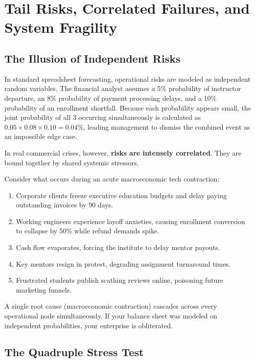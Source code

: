 \section{Tail Risks, Correlated Failures, and System Fragility}

\subsection{The Illusion of Independent Risks}

In standard spreadsheet forecasting, operational risks are modeled as independent random variables. The financial analyst assumes a 5\% probability of instructor departure, an 8\% probability of payment processing delays, and a 10\% probability of an enrollment shortfall. Because each probability appears small, the joint probability of all 3 occurring simultaneously is calculated as $0.05 \times 0.08 \times 0.10 = 0.04\%$, leading management to dismiss the combined event as an impossible edge case.

In real commercial crises, however, \textbf{risks are intensely correlated}. They are bound together by shared systemic stressors.

Consider what occurs during an acute macroeconomic tech contraction:
\begin{enumerate}[leftmargin=12pt,itemsep=2pt,topsep=1pt,parsep=0pt]
  \item Corporate clients freeze executive education budgets and delay paying outstanding invoices by 90 days.
  \item Working engineers experience layoff anxieties, causing enrollment conversion to collapse by 50\% while refund demands spike.
  \item Cash flow evaporates, forcing the institute to delay mentor payouts.
  \item Key mentors resign in protest, degrading assignment turnaround times.
  \item Frustrated students publish scathing reviews online, poisoning future marketing funnels.
\end{enumerate}

A single root cause (macroeconomic contraction) cascades across every operational node simultaneously. If your balance sheet was modeled on independent probabilities, your enterprise is obliterated.

\subsection{The Quadruple Stress Test}

